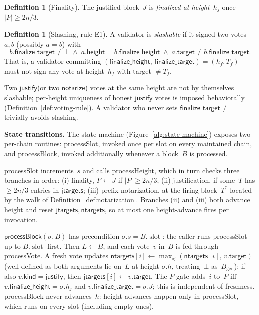 \documentclass{article}
\newcommand{\genesis}{\ensuremath{B_{\mathrm{gen}}}}
\newcommand{\slot}[0]{\ensuremath{\operatorname{\mathrm{slot}}}}
\newcommand{\target}{\mathsf{target}}
\newcommand{\kind}{\mathsf{kind}}
\newcommand{\height}{\mathsf{height}}
\newcommand{\just}{\ensuremath{\mathsf{justify}}\xspace}
\newcommand{\notar}{\ensuremath{\mathsf{notarize}}\xspace}
\newcommand{\finalizeHeight}{\mathsf{finalize\_height}}
\newcommand{\finalizeTarget}{\mathsf{finalize\_target}}
\newcommand{\jtargets}{\mathsf{jtargets}}
\newcommand{\ntargets}{\mathsf{ntargets}}
\newcommand{\processSlot}{\textsf{processSlot}\xspace}
\newcommand{\processBlock}{\textsf{processBlock}\xspace}
\newcommand{\processHeight}{\textsf{processHeight}\xspace}
\newcommand{\processVote}{\textsf{processVote}\xspace}
\renewcommand{\paragraph}[1]{\vspace{7pt}\noindent\textbf{#1}}
\theoremstyle{plain}
\theoremstyle{definition}
\newtheorem{definition}[theorem]{Definition}
\theoremstyle{remark}
\begin{document}
\begin{definition}[Finality]\label{def:finality}
The justified block~$J$ is \emph{finalized at height~$h_j$} once $|P| \geq 2n/3$.
\end{definition}

\begin{definition}[Slashing, rule E1]\label{def:slashing}
A validator is \emph{slashable} if it signed two votes~$a, b$ (possibly $a = b$) with
\[
  b.\finalizeTarget \neq \bot \;\wedge\; a.\height = b.\finalizeHeight \;\wedge\; a.\target \neq b.\finalizeTarget.
\]
That is, a validator committing $(\finalizeHeight,\, \finalizeTarget) = (h_f, T_f)$ must not sign any vote at height~$h_f$ with target $\neq T_f$.
\end{definition}

Two \just (or two \notar) votes at the same height are not by themselves slashable; per-height uniqueness of honest \just votes is imposed behaviorally (Definition~\ref{def:voting-rule}).
A validator who never sets $\finalizeTarget \neq \bot$ trivially avoids slashing.

\paragraph{State transitions.}
The state machine (Figure~\ref{alg:state-machine}) exposes two per-chain routines: \processSlot, invoked once per slot on every maintained chain, and \processBlock, invoked additionally whenever a block~$B$ is processed.

\processSlot increments~$s$ and calls \processHeight, which in turn checks three branches in order: (i) finality, $F \gets J$ if $|P| \geq 2n/3$; (ii) justification, if some~$T$ has $\geq 2n/3$ entries in $\jtargets$; (iii) prefix notarization, at the firing block~$T^*$ located by the walk of Definition~\ref{def:notarization}.
Branches (ii) and (iii) both advance height and reset $\jtargets, \ntargets$, so at most one height-advance fires per invocation.

$\processBlock(\sigma, B)$ has precondition $\sigma.s = B.\slot$: the caller runs \processSlot up to $B.\slot$ first.
Then $L \gets B$, and each vote~$v$ in~$B$ is fed through \processVote.
A fresh vote updates $\ntargets[i] \gets \max_{\preceq}(\ntargets[i],\, v.\target)$ (well-defined as both arguments lie on~$L$ at height $\sigma.h$, treating~$\bot$ as~$\genesis$); if also $v.\kind = \just$, then $\jtargets[i] \gets v.\target$.
The $P$-gate adds~$i$ to~$P$ iff $v.\finalizeHeight = \sigma.h_j$ and $v.\finalizeTarget = \sigma.J$; this is independent of freshness.
\processBlock never advances~$h$: height advances happen only in \processSlot, which runs on every slot (including empty ones).
\end{document}
